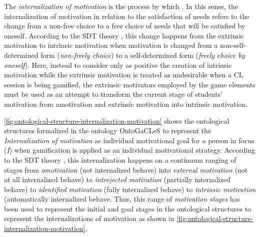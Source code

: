 The \emph{internalization of motivation} is the process by which  \cite{GagneDeci2005}. In this sense, the internalization of motivation in relation to the satisfaction of needs refers to the change from a non-free choice to a free choice of needs that will be satisfied by oneself. According to the SDT theory \cite{DeciRyan1985, RyanDeci2000}, this change happens from the extrinsic motivation to intrinsic motivation when motivation is changed from a non-self-determined form (\emph{non-freely choice}) to a self-determined form (\emph{freely choice by oneself}). Here, instead to consider only as positive the creation of intrinsic motivation while the extrinsic motivation is treated as undesirable when a CL session is being gamified, the extrinsic motivators employed by the game elements must be used as an attempt to transform the current stage of students' motivation from amotivation and extrinsic motivation into intrinsic motivation.

\autoref{fig:ontological-structure-internalization-motivation} shows the ontological structures formalized in the ontology OntoGaCLeS to represent the \emph{Internalization of motivation} as individual motivational goal for a person in focus (\emph{I}) when gamification is applied as an individual motivational strategy. According to the SDT theory \cite{DeciRyan2010, DeciVansteenkiste2004}, this internalization happens on a continuum ranging of stages from \emph{amotivation} (not internalized behave) into \emph{external motivation} (not at all internalized behave) to \emph{introjected motivation} (partially internalized behave) to \emph{identified motivation} (fully internalized behave) to \emph{intrinsic motivation} (automatically internalized behave. Thus, this range of \emph{motivation stages} has been used to represent the initial and goal stages in the ontological structures to represent the internalizations of motivation as shown in \autoref{fig:ontological-structure-internalization-motivation}.

